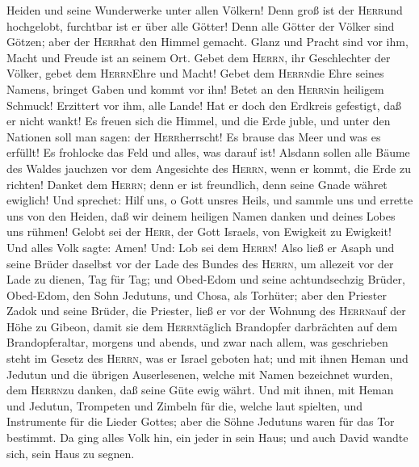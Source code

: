 Heiden und seine Wunderwerke unter allen Völkern!  Denn
groß ist der \textsc{Herr}und hochgelobt, furchtbar ist er über alle
Götter!  Denn alle Götter der Völker sind Götzen; aber
der \textsc{Herr}hat den Himmel gemacht.  Glanz und
Pracht sind vor ihm, Macht und Freude ist an seinem Ort. 
Gebet dem \textsc{Herrn}, ihr Geschlechter der Völker, gebet dem
\textsc{Herrn}Ehre und Macht!  Gebet dem
\textsc{Herrn}die Ehre seines Namens, bringet Gaben und kommt vor ihn!
Betet an den \textsc{Herrn}in heiligem Schmuck! 
Erzittert vor ihm, alle Lande! Hat er doch den Erdkreis gefestigt, daß
er nicht wankt!  Es freuen sich die Himmel, und die Erde
juble, und unter den Nationen soll man sagen: der \textsc{Herr}herrscht!
 Es brause das Meer und was es erfüllt! Es frohlocke das
Feld und alles, was darauf ist!  Alsdann sollen alle
Bäume des Waldes jauchzen vor dem Angesichte des \textsc{Herrn}, wenn er
kommt, die Erde zu richten!  Danket dem \textsc{Herrn};
denn er ist freundlich, denn seine Gnade währet ewiglich!
 Und sprechet: Hilf uns, o Gott unsres Heils, und sammle
uns und errette uns von den Heiden, daß wir deinem heiligen Namen danken
und deines Lobes uns rühmen!  Gelobt sei der
\textsc{Herr}, der Gott Israels, von Ewigkeit zu Ewigkeit! Und alles
Volk sagte: Amen! Und: Lob sei dem \textsc{Herrn}!  Also
ließ er Asaph und seine Brüder daselbst vor der Lade des Bundes des
\textsc{Herrn}, um allezeit vor der Lade zu dienen, Tag für Tag;
 und Obed-Edom und seine achtundsechzig Brüder,
Obed-Edom, den Sohn Jedutuns, und Chosa, als Torhüter; 
aber den Priester Zadok und seine Brüder, die Priester, ließ er vor der
Wohnung des \textsc{Herrn}auf der Höhe zu Gibeon,  damit
sie dem \textsc{Herrn}täglich Brandopfer darbrächten auf dem
Brandopferaltar, morgens und abends, und zwar nach allem, was
geschrieben steht im Gesetz des \textsc{Herrn}, was er Israel geboten
hat;  und mit ihnen Heman und Jedutun und die übrigen
Auserlesenen, welche mit Namen bezeichnet wurden, dem \textsc{Herrn}zu
danken, daß seine Güte ewig währt.  Und mit ihnen, mit
Heman und Jedutun, Trompeten und Zimbeln für die, welche laut spielten,
und Instrumente für die Lieder Gottes; aber die Söhne Jedutuns waren für
das Tor bestimmt.  Da ging alles Volk hin, ein jeder in
sein Haus; und auch David wandte sich, sein Haus zu segnen.

